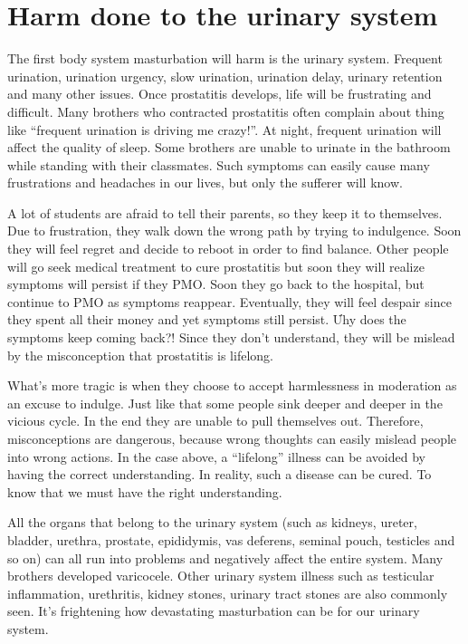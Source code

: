 \documentclass[
]{book}
\begin{document}
\hypertarget{harm-done-to-the-urinary-system}{%
\section{Harm done to the urinary system}\label{harm-done-to-the-urinary-system}}

The first body system masturbation will harm is the urinary system. Frequent urination, urination urgency, slow urination, urination delay, urinary retention and many other issues. Once prostatitis develops, life will be frustrating and difficult. Many brothers who contracted prostatitis often complain about thing like ``frequent urination is driving me crazy!''. At night, frequent urination will affect the quality of sleep. Some brothers are unable to urinate in the bathroom while standing with their classmates. Such symptoms can easily cause many frustrations and headaches in our lives, but only the sufferer will know.

A lot of students are afraid to tell their parents, so they keep it to themselves. Due to frustration, they walk down the wrong path by trying to indulgence. Soon they will feel regret and decide to reboot in order to find balance. Other people will go seek medical treatment to cure prostatitis but soon they will realize symptoms will persist if they PMO. Soon they go back to the hospital, but continue to PMO as symptoms reappear. Eventually, they will feel despair since they spent all their money and yet symptoms still persist. Ưhy does the symptoms keep coming back?! Since they don't understand, they will be mislead by the misconception that prostatitis is lifelong.

What's more tragic is when they choose to accept harmlessness in moderation as an excuse to indulge. Just like that some people sink deeper and deeper in the vicious cycle. In the end they are unable to pull themselves out. Therefore, misconceptions are dangerous, because wrong thoughts can easily mislead people into wrong actions. In the case above, a ``lifelong'' illness can be avoided by having the correct understanding. In reality, such a disease can be cured. To know that we must have the right understanding.

All the organs that belong to the urinary system (such as kidneys, ureter, bladder, urethra, prostate, epididymis, vas deferens, seminal pouch, testicles and so on) can all run into problems and negatively affect the entire system. Many brothers developed varicocele. Other urinary system illness such as testicular inflammation, urethritis, kidney stones, urinary tract stones are also commonly seen. It's frightening how devastating masturbation can be for our urinary system.
\end{document}
